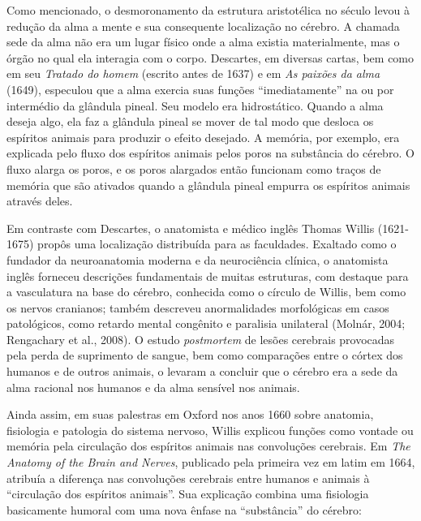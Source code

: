 Como mencionado, o desmoronamento da estrutura aristotélica no século
 levou à redução da alma a mente e sua consequente localização no
cérebro. A chamada sede da alma não era um lugar físico onde a alma
existia materialmente, mas o órgão no qual ela interagia com o corpo.
Descartes, em diversas cartas, bem como em seu \emph{Tratado do homem}
(escrito antes de 1637) e em \emph{As paixões da alma} (1649), especulou
que a alma exercia suas funções ``imediatamente'' na ou por intermédio
da glândula pineal. Seu modelo era hidrostático. Quando a alma deseja
algo, ela faz a glândula pineal se mover de tal modo que desloca os
espíritos animais para produzir o efeito desejado. A memória, por exemplo,
era explicada pelo fluxo dos espíritos animais pelos poros na substância
do cérebro. O fluxo alarga os poros, e os poros alargados então
funcionam como traços de memória que são ativados quando a glândula
pineal empurra os espíritos animais através deles.

Em contraste com Descartes, o anatomista e médico inglês Thomas Willis
(1621-1675) propôs uma localização distribuída para as faculdades.
Exaltado como o fundador da neuroanatomia moderna e da neurociência
clínica, o anatomista inglês forneceu descrições fundamentais de muitas
estruturas, com destaque para a vasculatura na base do cérebro,
conhecida como o círculo de Willis, bem como os nervos cranianos; também
descreveu anormalidades morfológicas em casos patológicos, como retardo
mental congênito e paralisia unilateral (Molnár, 2004; Rengachary et
al., 2008). O estudo \emph{postmortem} de lesões cerebrais provocadas
pela perda de suprimento de sangue, bem como comparações entre o córtex
dos humanos e de outros animais, o levaram a concluir que o cérebro era a
sede da alma racional nos humanos e da alma sensível nos animais.

Ainda assim, em suas palestras em Oxford nos anos 1660 sobre anatomia,
fisiologia e patologia do sistema nervoso, Willis explicou funções como
vontade ou memória pela circulação dos espíritos animais nas convoluções
cerebrais. Em \emph{The Anatomy of the Brain and Nerves}, publicado pela
primeira vez em latim em 1664, atribuía a diferença nas convoluções
cerebrais entre humanos e animais à ``circulação dos espíritos
animais''. Sua explicação combina uma fisiologia basicamente humoral com
uma nova ênfase na ``substância'' do cérebro:

